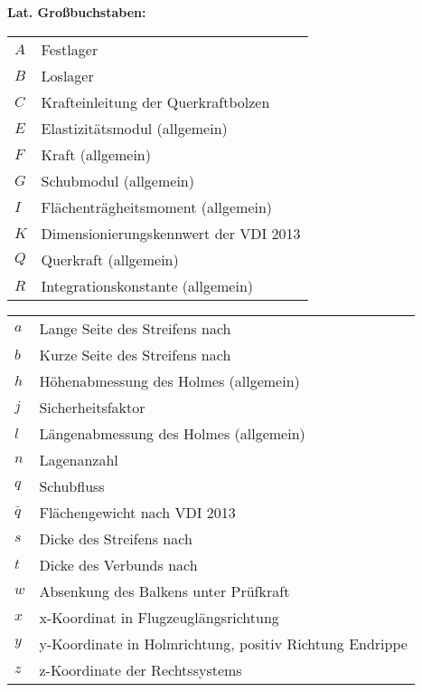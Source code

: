 \textbf{Lat. Großbuchstaben:}\\
\begin{table}

\begin{tabular}{ll}
	$ A $&Festlager\\
	$ B $&Loslager\\
	$ C $&Krafteinleitung der Querkraftbolzen\\
	$ E $&Elastizitätsmodul (allgemein)\\
	$ F $&Kraft (allgemein)\\
	$ G $&Schubmodul (allgemein)\\
	$ I $&Flächenträgheitsmoment (allgemein)\\
	$ K $&Dimensionierungskennwert der VDI 2013\\
	$ Q $&Querkraft (allgemein)\\
	$ R $&Integrationskonstante (allgemein)\\
	
\end{tabular}
\end{table}

\begin{table}
	\begin{tabular}{ll}
		$ a $&Lange Seite des Streifens nach \cite{item1}\\
		$ b $&Kurze Seite des Streifens nach \cite{item1}\\
		$ h $&Höhenabmessung des Holmes (allgemein)\\
		$ j $&Sicherheitsfaktor\\
		$ l $&Längenabmessung des Holmes (allgemein)\\
		$ n $&Lagenanzahl\\
		$ q $&Schubfluss\\
		$ \bar{q} $&Flächengewicht nach VDI 2013\\
		$ s $&Dicke des Streifens nach \cite{item1}\\
		$ t $&Dicke des Verbunds nach \cite{item3}\\
		$ w $&Absenkung des Balkens unter Prüfkraft\\
		$ x $&x-Koordinat in Flugzeuglängsrichtung\\
		$ y $&y-Koordinate in Holmrichtung, positiv Richtung Endrippe\\
		$ z $&z-Koordinate der Rechtssystems\\
		
	\end{tabular}
\end{table}

